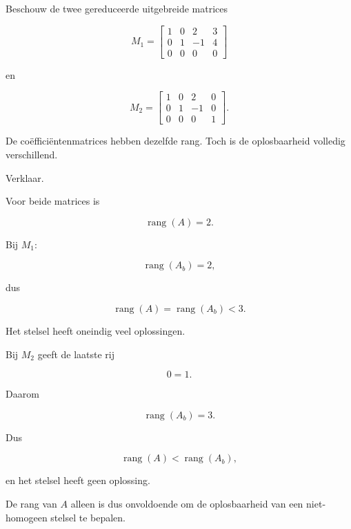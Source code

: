\documentclass{ximera}
\begin{document}
\begin{oefening}{\oefU\ESS}

Beschouw de twee gereduceerde uitgebreide matrices

\[
M_1=
\left[
\begin{array}{ccc|c}
1&0&2&3\\
0&1&-1&4\\
0&0&0&0
\end{array}
\right]
\]

en

\[
M_2=
\left[
\begin{array}{ccc|c}
1&0&2&0\\
0&1&-1&0\\
0&0&0&1
\end{array}
\right].
\]

\begin{question}

De coëfficiëntenmatrices hebben dezelfde rang.
Toch is de oplosbaarheid volledig verschillend.

Verklaar.

\begin{oplossing}

Voor beide matrices is

\[
\operatorname{rang}(A)=2.
\]

Bij \(M_1\):

\[
\operatorname{rang}(A_b)=2,
\]

dus

\[
\operatorname{rang}(A)
=
\operatorname{rang}(A_b)
<
3.
\]

Het stelsel heeft oneindig veel oplossingen.

Bij \(M_2\) geeft de laatste rij

\[
0=1.
\]

Daarom

\[
\operatorname{rang}(A_b)=3.
\]

Dus

\[
\operatorname{rang}(A)
<
\operatorname{rang}(A_b),
\]

en het stelsel heeft geen oplossing.

De rang van \(A\) alleen is dus onvoldoende om de oplosbaarheid
van een niet-homogeen stelsel te bepalen.

\end{oplossing}

\end{question}

\end{oefening}
\end{document}
